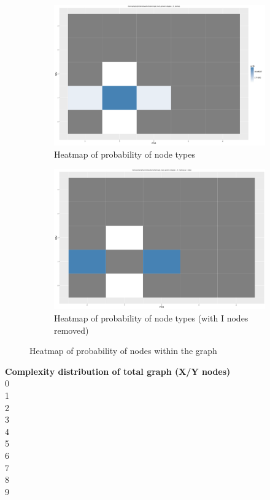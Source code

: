 \documentclass[a4paper, 12pt, oneside]{article}
\begin{document}
\begin{figure}[h]
\centering
\begin{subfigure}[b]{0.45\textwidth}
\includegraphics[width=\textwidth]{graphs/E_heatmap.png}
\caption{\label{fig:Heat}Heatmap of probability of node types}
\end{subfigure}
\begin{subfigure}[b]{0.45\textwidth}
\includegraphics[width=\textwidth]{graphs/E_heatmap_noI.png}
\caption{\label{fig:Heat without I}Heatmap of probability of node types (with I nodes removed)}
\end{subfigure}
\caption{Heatmap of probability of nodes within the graph}\label{fig:E_and_I}
\end{figure}
\newpage

\textbf{Complexity distribution of total graph (X/Y nodes)}\\
0\\
1\\
2\\
3\\
4\\
5\\
6\\
7\\
8\\
9\\
\end{document}
